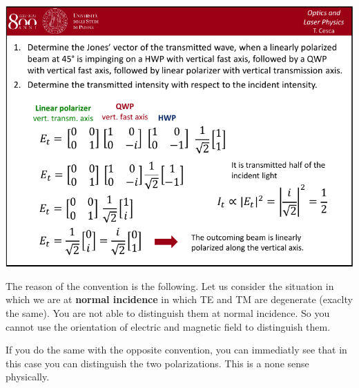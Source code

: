 \documentclass[../main/main.tex]{subfiles}
\begin{document}
\begin{minipage}[]{0.5\linewidth}
\centering
\includegraphics[page=18,width=1\textwidth]{../lessons/pdf_file/04_lecture.pdf}
\end{minipage}
\hspace{0.3cm}\vspace{0.3cm}
\begin{minipage}[c]{0.47\linewidth}

The reason of the convention is the following. Let us consider the situation in which we are at \textbf{normal incidence} in which TE and TM are degenerate (exaclty the same). You are not able to distinguish them at normal incidence. So you cannot use the orientation of electric and magnetic field to distinguish them.

If you do the same with the opposite convention, you can immediatly see that in this case you can distinguish the two polarizations. This is a none sense physically.

\end{minipage}
\end{document}
